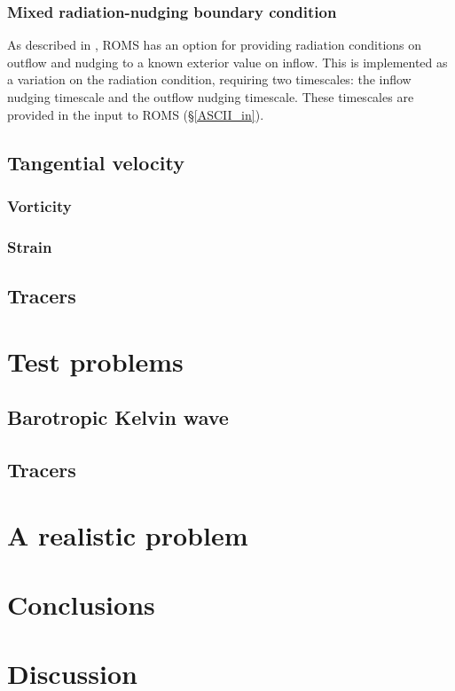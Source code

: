 \documentclass[11pt]{article}
\begin{document}
\subsubsection{Mixed radiation-nudging boundary condition}
As described in \citep{Marchesiello2001}, ROMS has an option for providing
radiation conditions on outflow and nudging to a known exterior
value on inflow. This is implemented as a variation on the radiation
condition, requiring two timescales: the inflow nudging timescale and the
outflow nudging timescale. These timescales are provided in the input to
ROMS (\S\ref{ASCII_in}).

\subsection{Tangential velocity}
\subsubsection{Vorticity}
\subsubsection{Strain}
\subsection{Tracers}
\section{Test problems}
\subsection{Barotropic Kelvin wave}
\subsection{Tracers}
\section{A realistic problem}
\section{Conclusions}
\section{Discussion}



\end{document}
